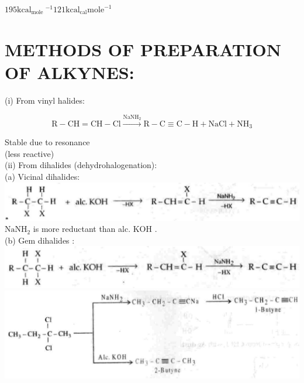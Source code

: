 \documentclass[10pt]{article}
\begin{document}
$195 \mathrm{kcal}_{\text {mole }}{ }^{-1} 121 \mathrm{kcal}_{\mathrm{cal}} \mathrm{mole}^{-1}$

\section*{METHODS OF PREPARATION OF ALKYNES:}
(i) From vinyl halides:

$$
\mathrm{R}-\mathrm{CH}=\mathrm{CH}-\mathrm{Cl} \xrightarrow{\mathrm{NaNH}_{2}} \mathrm{R}-\mathrm{C} \equiv \mathrm{C}-\mathrm{H}+\mathrm{NaCl}+\mathrm{NH}_{3}
$$

Stable due to resonance\\
(less reactive)\\
(ii) From dihalides (dehydrohalogenation):\\
(a) Vicinal dihalides:\\
\includegraphics[max width=\textwidth, center]{2025_01_28_8470952b98110cec3aabg-186(1)}\\
$\mathrm{NaNH}_{2}$ is more reductant than alc. KOH .\\
(b) Gem dihalides :\\
\includegraphics[max width=\textwidth, center]{2025_01_28_8470952b98110cec3aabg-186(2)}\\
\includegraphics[max width=\textwidth, center]{2025_01_28_8470952b98110cec3aabg-187(3)}
\end{document}
